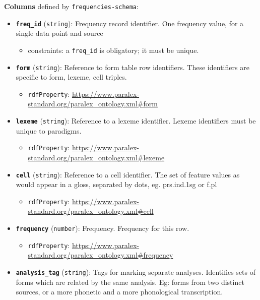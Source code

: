 \textbf{Columns} defined by \texttt{frequencies-schema}:

\begin{itemize}
\item
  \textbf{\texttt{freq\_id}} (\texttt{string}): Frequency record
  identifier. One frequency value, for a single data point and source

  \begin{itemize}
  \tightlist
  \item
    constraints: a \texttt{freq\_id} is obligatory; it must be unique.
  \end{itemize}
\item
  \textbf{\texttt{form}} (\texttt{string}): Reference to form table row
  identifiers. These identifiers are specific to form, lexeme, cell
  triples.

  \begin{itemize}
  \tightlist
  \item
    \texttt{rdfProperty}:
    \url{https://www.paralex-standard.org/paralex_ontology.xml\#form}
  \end{itemize}
\item
  \textbf{\texttt{lexeme}} (\texttt{string}): Reference to a lexeme
  identifier. Lexeme identifiers must be unique to paradigms.

  \begin{itemize}
  \tightlist
  \item
    \texttt{rdfProperty}:
    \url{https://www.paralex-standard.org/paralex_ontology.xml\#lexeme}
  \end{itemize}
\item
  \textbf{\texttt{cell}} (\texttt{string}): Reference to a cell
  identifier. The set of feature values as would appear in a gloss,
  separated by dots, eg. prs.ind.1sg or f.pl

  \begin{itemize}
  \tightlist
  \item
    \texttt{rdfProperty}:
    \url{https://www.paralex-standard.org/paralex_ontology.xml\#cell}
  \end{itemize}
\item
  \textbf{\texttt{frequency}} (\texttt{number}): Frequency. Frequency
  for this row.

  \begin{itemize}
  \tightlist
  \item
    \texttt{rdfProperty}:
    \url{https://www.paralex-standard.org/paralex_ontology.xml\#frequency}
  \end{itemize}
\item
  \textbf{\texttt{analysis\_tag}} (\texttt{string}): Tags for marking
  separate analyses. Identifies sets of forms which are related by the
  same analysis. Eg: forms from two distinct sources, or a more phonetic
  and a more phonological transcription.


\end{itemize}
